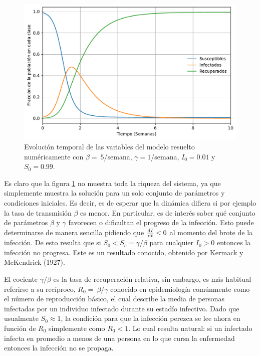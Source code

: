 \begin{figure}[t]
  \centering
  \includegraphics[width=\imsize]{SIR.pdf}
  \caption[Solución numérica del modelo S-I-R]{Evolución temporal de las variables del modelo resuelto numéricamente 
  con $\beta=~5$/semana, $\gamma=1$/semana, $I_0=0.01$ y $S_0=0.99$.}
  \label{fig:SIR}
\end{figure}


Es claro que la figura \ref{fig:SIR} no muestra toda la riqueza del sistema, ya que simplemente muestra la solución para un solo conjunto de parámetros y 
condiciones iniciales. Es decir, es de esperar que la dinámica difiera si por ejemplo la tasa de transmisión $\beta$ es menor. En particular, es de 
interés saber qué conjunto de parámetros $\beta$ y $\gamma$ favorecen o dificultan el progreso de la infección. Esto puede determinarse de manera sencilla pidiendo que $\dv{I}{t}<0$ 
al momento del brote de la infección. De esto resulta que si $S_0<S_c=\gamma/\beta$ para cualquier $I_0>0$ entonces la infección no progresa. 
Este es un resultado conocido, obtenido por Kermack y McKendrick (1927).

El cociente $\gamma/\beta$ es la tasa de recuperación relativa, sin embargo, es más habitual referirse a su recíproco, $R_0=~\beta/\gamma$ 
conocido en epidemiología comúnmente como el número de reproducción básico, el cual describe la media de personas infectadas por un individuo 
infectado durante su estadío infectivo. Dado que usualmente $S_0\approx 1$, la condición para que la infección perezca se lee ahora en función de $R_0$
simplemente como $R_0 < 1$. Lo cual resulta natural: si un infectado infecta en promedio a menos de una persona en lo que cursa la enfermedad entonces 
la infección no se propaga. 

